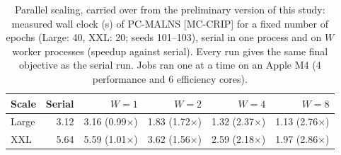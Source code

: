 \begin{table}[pos=H]
\centering
\caption{Parallel scaling, carried over from the preliminary version of this study: measured wall clock (s) of PC-MALNS [MC-CRIP] for a fixed number of epochs (Large: 40, XXL: 20; seeds 101--103), serial in one process and on $W$ worker processes (speedup against serial). Every run gives the same final objective as the serial run. Jobs ran one at a time on an Apple M4 (4 performance and 6 efficiency cores).}
\label{tab:scaling}
\footnotesize
\begin{tabular}{@{}lrrrrr@{}}
\toprule
Scale & Serial & $W = 1$ & $W = 2$ & $W = 4$ & $W = 8$ \\
\midrule
Large & 3.12 & 3.16 (0.99$\times$) & 1.83 (1.72$\times$) & 1.32 (2.37$\times$) & 1.13 (2.76$\times$) \\
XXL & 5.64 & 5.59 (1.01$\times$) & 3.62 (1.56$\times$) & 2.59 (2.18$\times$) & 1.97 (2.86$\times$) \\
\bottomrule
\end{tabular}
\end{table}
